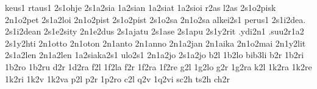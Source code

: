 {keus1       %
rtaus1
2s1ohje     %
2s1a2sia    %
1a2sian     %
1a2siat     %
1a2sioi     %
r2as l2as   %
2s1o2pisk   %
2n1o2pet
2s1a2loi
2n1o2pist    %
2s1o2pist
2s1o2sa      %
2n1o2sa      %
alkei2s1
perus1
2s1i2dea. 2s1i2dean
2s1e2sity    %
2n1e2dus     %
2s1ajatu     %
2s1ase
2s1apu
2s1y2rit     %
.ydi2n1
.suu2r1a2    %
2s1y2hti
2n1otto 2n1oton
2n1anto 2n1anno
2n1a2jan 2n1aika
2n1o2mai
2n1y2lit
2s1a2len
2n1a2len
1a2siaka2s1
ulo2s1        %
2n1a2jo       %
2s1a2jo
%
%
%
b2l 1b2lo bib3li
b2r 1b2ri 1b2ro 1b2ru
d2r 1d2ra
f2l 1f2la
f2r 1f2ra 1f2re
g2l 1g2lo
g2r 1g2ra
k2l
1k2ra 1k2re 1k2ri
1k2v 1k2va
p2l
p2r 1p2ro
c2l
q2v 1q2vi
sc2h ts2h
ch2r
}

